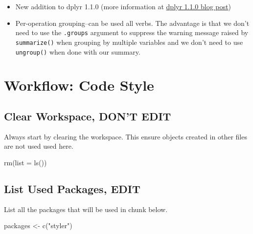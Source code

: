 \documentclass[
  letterpaper,
  DIV=11,
  numbers=noendperiod]{scrreprt}
\newenvironment{Shaded}{\begin{snugshade}}{\end{snugshade}}
\newcommand{\AttributeTok}[1]{\textcolor[rgb]{0.40,0.45,0.13}{#1}}
\newcommand{\FunctionTok}[1]{\textcolor[rgb]{0.28,0.35,0.67}{#1}}
\newcommand{\NormalTok}[1]{\textcolor[rgb]{0.00,0.23,0.31}{#1}}
\newcommand{\OtherTok}[1]{\textcolor[rgb]{0.00,0.23,0.31}{#1}}
\newcommand{\StringTok}[1]{\textcolor[rgb]{0.13,0.47,0.30}{#1}}
\providecommand{\tightlist}{%
  \setlength{\itemsep}{0pt}\setlength{\parskip}{0pt}}\usepackage{longtable,booktabs,array}
\begin{document}
\begin{itemize}
  \begin{itemize}
  \tightlist
  \item
    New addition to dplyr 1.1.0 (more information at
    \href{https://www.tidyverse.org/blog/2023/02/dplyr-1-1-0-per-operation-grouping/}{dplyr
    1.1.0 blog post})
  \item
    Per-operation grouping--can be used all verbs. The advantage is that
    we don't need to use the \texttt{.groups} argument to suppress the
    warning message raised by \texttt{summarize()} when grouping by
    multiple variables and we don't need to use \texttt{ungroup()} when
    done with our summary.
  \end{itemize}
\end{itemize}

\chapter{Workflow: Code Style}\label{workflow-code-style}

\section*{Clear Workspace, DON'T
EDIT}\label{clear-workspace-dont-edit-6}


Always start by clearing the workspace. This ensure objects created in
other files are not used used here.

\begin{Shaded}
\begin{Highlighting}[]
\FunctionTok{rm}\NormalTok{(}\AttributeTok{list =} \FunctionTok{ls}\NormalTok{())}
\end{Highlighting}
\end{Shaded}

\section*{List Used Packages, EDIT}\label{list-used-packages-edit-6}


List all the packages that will be used in chunk below.

\begin{Shaded}
\begin{Highlighting}[]
\NormalTok{packages }\OtherTok{\textless{}{-}} \FunctionTok{c}\NormalTok{(}\StringTok{"styler"}\NormalTok{)}
\end{Highlighting}
\end{Shaded}
\end{document}

